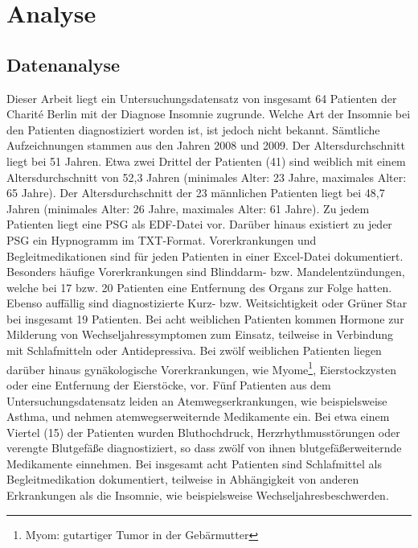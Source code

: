 \chapter{Analyse}

\section{Datenanalyse}

Dieser Arbeit liegt ein Untersuchungsdatensatz von insgesamt 64 Patienten der Charit\'{e} Berlin mit der Diagnose Insomnie zugrunde. Welche Art der Insomnie bei den Patienten diagnostiziert worden ist, ist jedoch nicht bekannt. Sämtliche Aufzeichnungen stammen aus den Jahren 2008 und 2009. Der Altersdurchschnitt liegt bei 51 Jahren. Etwa zwei Drittel der Patienten (41) sind weiblich mit einem Altersdurchschnitt von 52,3 Jahren (minimales Alter: 23 Jahre, maximales Alter: 65 Jahre). Der Altersdurchschnitt der 23 männlichen Patienten liegt bei 48,7 Jahren (minimales Alter: 26 Jahre, maximales Alter: 61 Jahre). Zu jedem Patienten liegt eine \acs{PSG} als \acs{EDF}-Datei vor. Darüber hinaus existiert zu jeder \acs{PSG} ein Hypnogramm im TXT-Format. Vorerkrankungen und Begleitmedikationen sind für jeden Patienten in einer Excel-Datei dokumentiert.\\

Besonders häufige Vorerkrankungen sind Blinddarm- bzw. Mandelentzündungen, welche bei 17 bzw. 20 Patienten eine Entfernung des Organs zur Folge hatten. Ebenso auffällig sind diagnostizierte Kurz- bzw. Weitsichtigkeit oder Grüner Star bei insgesamt 19 Patienten. Bei acht weiblichen Patienten kommen Hormone zur Milderung von Wechseljahressymptomen zum Einsatz, teilweise in Verbindung mit Schlafmitteln oder Antidepressiva. Bei zwölf weiblichen Patienten liegen darüber hinaus gynäkologische Vorerkrankungen, wie Myome\footnote{Myom: gutartiger Tumor in der Gebärmutter}, Eierstockzysten oder eine Entfernung der Eierstöcke, vor. Fünf Patienten aus dem Untersuchungsdatensatz leiden an Atemwegserkrankungen, wie beispielsweise Asthma, und nehmen atemwegserweiternde Medikamente ein. Bei etwa einem Viertel (15) der Patienten wurden Bluthochdruck, Herzrhythmusstörungen oder verengte Blutgefäße diagnostiziert, so dass zwölf von ihnen blutgefäßerweiternde Medikamente einnehmen. Bei insgesamt acht Patienten sind Schlafmittel als Begleitmedikation dokumentiert, teilweise in Abhängigkeit von anderen Erkrankungen als die Insomnie, wie beispielsweise Wechseljahresbeschwerden.\\

